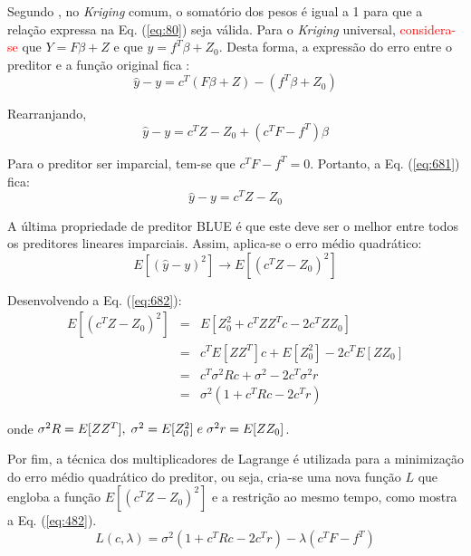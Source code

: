 Segundo , no {\it Kriging} comum, o somatório dos pesos é igual a 1 para que a relação expressa na Eq. (\ref{eq:80}) seja válida. Para o {\it Kriging} universal, \textcolor{red}{considera-se} que $Y=F\beta+Z$ e que $y={f}^T\beta+{Z}_0$. Desta forma, a expressão do erro entre o preditor e a função original fica \cite{Dubourg2011}:
\begin{equation} \label{eq:68}
\hat{y}-y = {c}^T(F\beta+Z)-({f}^T\beta+{Z}_0) 
\end{equation}

Rearranjando,
\begin{equation} \label{eq:681}
\hat{y}-y = {c}^TZ-{Z}_0 + ({c}^TF-{f}^T)\beta
\end{equation}

Para o preditor ser imparcial, tem-se que ${c}^TF-{f}^T = 0$. Portanto, a Eq. (\ref{eq:681}) fica:
\begin{equation}
\hat{y}-y = {c}^TZ-{Z}_0
\end{equation}

A última propriedade de preditor BLUE é que este deve ser o melhor entre todos os preditores lineares imparciais. Assim, aplica-se o erro médio quadrático:
\begin{equation} \label{eq:682}
E [(\hat{y}-y)^2] \rightarrow E [({c}^TZ-{Z}_0)^2]
\end{equation}

Desenvolvendo a Eq. (\ref{eq:682}):
\begin{eqnarray}
 \label{eq:683}
 E [({c}^TZ-{Z}_0)^2] & = & E \left[{Z}_0^2+{c}^TZ{Z}^Tc-2{c}^TZ{Z}_0\right] \\
           & = & {c}^T E[Z{Z}^T]c + E[{Z}_0^2] - 2{c}^T E[Z{Z}_0]\nonumber\\
          & = & {c}^T{\sigma}^2Rc + {\sigma}^2 - 2{c}^T{\sigma}^2r \nonumber\\
           & = & {\sigma}^2\left(1+{c}^TRc-2{c}^Tr\right) \nonumber
\end{eqnarray}

\noindent onde ${\sigma}^2R = E[Z{Z}^T], \hspace{0.1 cm} {\sigma}^2 = E[{Z}_0^2] \hspace{0.1 cm} e \hspace{0.1 cm} {\sigma}^2r = E[Z{Z}_0]$.

Por fim, a técnica dos multiplicadores de Lagrange é utilizada para a minimização do erro médio quadrático do preditor, ou seja, cria-se uma nova função $L$ que engloba a função $ E [({c}^TZ-{Z}_0)^2]$ e a restrição ao mesmo tempo, como mostra a Eq. (\ref{eq:482}).
\begin{equation}
L(c,\lambda) = {\sigma}^2\left(1+{c}^TRc-2{c}^Tr\right) - \lambda({c}^TF-{f}^T)
\label{eq:482}
\end{equation}

